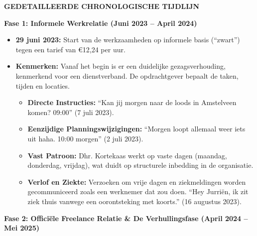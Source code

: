 \documentclass[10pt,a4paper]{article}
\begin{document}
\begin{adjustwidth}{15mm}{15mm}

\vspace{1em}

{\fontsize{11}{16}\selectfont\textbf{GEDETAILLEERDE CHRONOLOGISCHE TIJDLIJN}}

{\fontsize{10}{15}\selectfont\textbf{Fase 1: Informele Werkrelatie (Juni 2023 – April 2024)}}

\begin{itemize}
\item \textbf{29 juni 2023:} Start van de werkzaamheden op informele basis (``zwart'') tegen een tarief van €12,24 per uur.
\item \textbf{Kenmerken:} Vanaf het begin is er een duidelijke gezagsverhouding, kenmerkend voor een dienstverband. De opdrachtgever bepaalt de taken, tijden en locaties.
    \begin{itemize}
    \item \textbf{Directe Instructies:} ``Kan jij morgen naar de loods in Amstelveen komen? 09:00'' (7 juli 2023).
    \item \textbf{Eenzijdige Planningswijzigingen:} ``Morgen loopt allemaal weer iets uit haha. 10:00 morgen'' (2 juli 2023).
    \item \textbf{Vast Patroon:} Dhr. Kortekaas werkt op vaste dagen (maandag, donderdag, vrijdag), wat duidt op structurele inbedding in de organisatie.
    \item \textbf{Verlof en Ziekte:} Verzoeken om vrije dagen en ziekmeldingen worden gecommuniceerd zoals een werknemer dat zou doen. ``Hey Jurriën, ik zit ziek thuis vanwege een oorontsteking met koorts.'' (16 augustus 2023).
    \end{itemize}
\end{itemize}

{\fontsize{10}{15}\selectfont\textbf{Fase 2: Officiële Freelance Relatie \& De Verhullingsfase (April 2024 – Mei 2025)}}


\end{adjustwidth}
\end{document}
